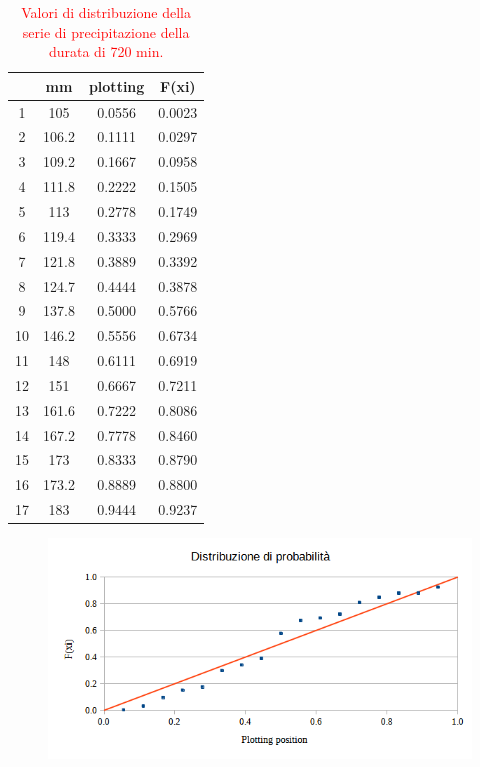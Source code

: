 \begin{table}[H] \centering
    \caption{\textcolor{red}{Valori di distribuzione della serie di precipitazione della durata di 720 min.}}
            \begin{tabular}{cccc} 
            \toprule
               & mm    & plotting & F(xi)  \\
            \midrule
            1  & 105   & 0.0556   & 0.0023 \\
            2  & 106.2 & 0.1111   & 0.0297 \\
            3  & 109.2 & 0.1667   & 0.0958 \\
            4  & 111.8 & 0.2222   & 0.1505 \\
            5  & 113   & 0.2778   & 0.1749 \\
            6  & 119.4 & 0.3333   & 0.2969 \\
            7  & 121.8 & 0.3889   & 0.3392 \\
            8  & 124.7 & 0.4444   & 0.3878 \\
            9  & 137.8 & 0.5000   & 0.5766 \\
            10 & 146.2 & 0.5556   & 0.6734 \\
            11 & 148   & 0.6111   & 0.6919 \\
            12 & 151   & 0.6667   & 0.7211 \\
            13 & 161.6 & 0.7222   & 0.8086 \\
            14 & 167.2 & 0.7778   & 0.8460 \\
            15 & 173   & 0.8333   & 0.8790 \\
            16 & 173.2 & 0.8889   & 0.8800 \\
            17 & 183   & 0.9444   & 0.9237 \\
            \bottomrule
            \end{tabular}
            \end{table}

\begin{figure}[H]\centering
\includegraphics[scale=0.75]{immagini/distr_prob_720min.png}
\end{figure}

